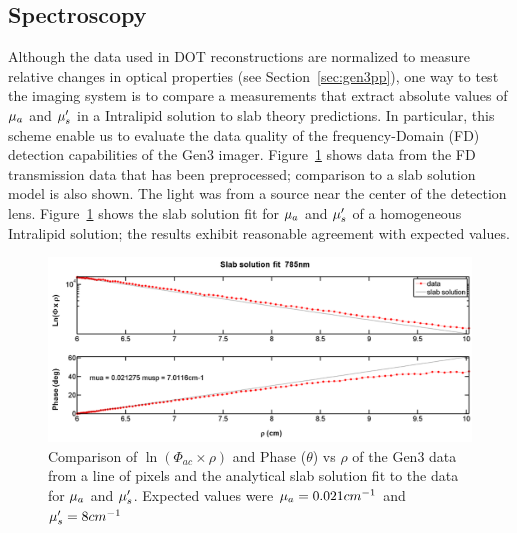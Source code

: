 \subsection{Spectroscopy}
Although the data used in DOT reconstructions are normalized to measure relative changes in optical properties (see Section~\ref{sec:gen3pp}), one way to test the imaging system is to compare a measurements that extract absolute values of $\mu_a$ and $\mu_s^{\prime}$ in a Intralipid solution to slab theory predictions. In particular, this scheme enable us to evaluate the data quality of the frequency-Domain (FD) detection capabilities of the Gen3 imager. Figure~\ref{fig:slabfit} shows data from the FD transmission data that has been preprocessed;  comparison to a slab solution model is also shown. The light was from a source near the center of the detection lens. Figure~\ref{fig:slabfit} shows the slab solution fit for $\mu_a$ and $\mu_s^{\prime}$ of a homogeneous Intralipid solution; the results exhibit reasonable agreement with expected values.
%
\begin{figure}
\centering
\includegraphics[width=14.5cm]{./figures/4_Gen3/slabfit.png}
\caption[Slab solution fit to frequency-domain data]{Comparison of $\ln (\Phi_{ac}\times\rho)$ and Phase ($\theta$) vs $\rho$ of the Gen3 data from a line of pixels and the analytical slab solution fit to the data for $\mu_a$ and $\mu_s^{\prime}$. Expected values were $\mu_a= 0.021 cm^{-1}$ and $\mu_s^{\prime}=8cm^{-1}$}
\label{fig:slabfit}
\end{figure}
\floatbarrier
